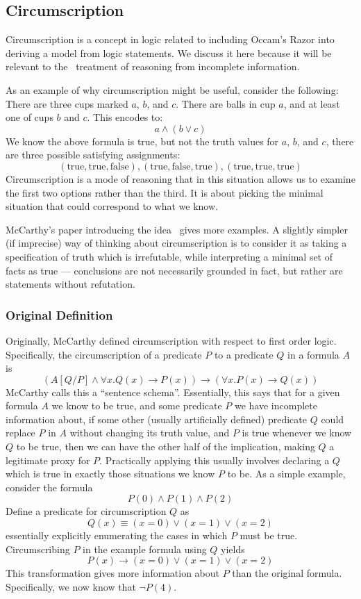\subsection{Circumscription}
\label{sec:circumscription}
Circumscription is a concept in logic related to including Occam's Razor into deriving a model from logic statements.
We discuss it here because it will be relevant to the \sysname\ treatment of reasoning from incomplete information.

\newcommand{\true}{\textrm{true}}
\newcommand{\false}{\textrm{false}}
As an example of why circumscription might be useful, consider the following:
There are three cups marked $a$, $b$, and $c$.
There are balls in cup $a$, and at least one of cups $b$ and $c$.
This encodes to:
\[a \wedge (b \vee c)\]
We know the above formula is true, but not the truth values for $a$, $b$, and $c$, there are three possible satisfying assignments:
\[
        (\true, \true, \false), (\true, \false, \true), (\true, \true, \true)
\]
Circumscription is a mode of reasoning that in this situation allows us to examine the first two options rather than the third.
It is about picking the minimal situation that could correspond to what we know.

McCarthy's paper introducing the idea~\cite{circumscription} gives more examples.
A slightly simpler (if imprecise) way of thinking about circumscription is to consider it as taking a specification of truth which is irrefutable, while interpreting a minimal set of facts as true --- conclusions are not necessarily grounded in fact, but rather are statements without refutation.
\subsubsection{Original Definition}
Originally, McCarthy defined circumscription with respect to first order logic.
Specifically, the circumscription of a predicate $P$ to a predicate $Q$ in a formula $A$ is
\[
(A [Q/P] \wedge \forall x. Q(x) \rightarrow P(x)) \rightarrow (\forall x. P(x) \rightarrow Q(x))
\]
McCarthy calls this a ``sentence schema''.
Essentially, this says that for a given formula $A$ we know to be true, and some predicate $P$ we have incomplete information about, if some other (usually artificially defined) predicate $Q$ could replace $P$ in $A$ without changing its truth value, and $P$ is true whenever we know $Q$ to be true, then we can have the other half of the implication, making $Q$ a legitimate proxy for $P$.
Practically applying this usually involves declaring a $Q$ which is true in exactly those situations we know $P$ to be.
As a simple example, consider the formula
\[
        P(0) \wedge P(1) \wedge P(2)
\]
Define a predicate for circumscription $Q$ as
\[
        Q(x) \equiv (x = 0) \vee (x = 1) \vee (x = 2)
\]
essentially explicitly enumerating the cases in which $P$ must be true.
Circumscribing $P$ in the example formula using $Q$ yields
\[
        P(x) \rightarrow (x = 0) \vee (x = 1) \vee (x = 2)
\]
This transformation gives more information about $P$ than the original formula.
Specifically, we now know that $\neg P(4)$.

